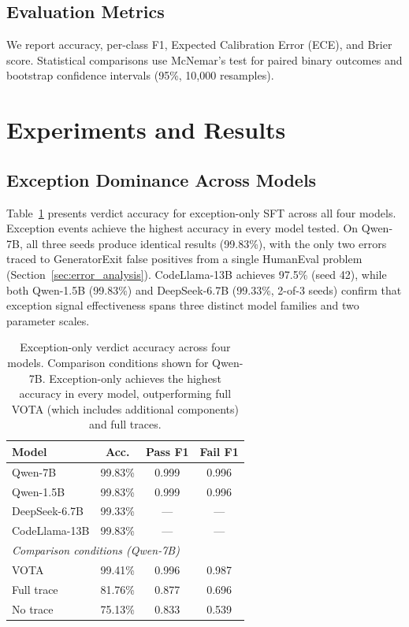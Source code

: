 \documentclass[11pt,a4paper]{article}
\begin{document}
\subsection{Evaluation Metrics}

We report accuracy, per-class F1, Expected Calibration Error (ECE), and Brier score. Statistical comparisons use McNemar's test for paired binary outcomes and bootstrap confidence intervals (95\%, 10,000 resamples).

\section{Experiments and Results}

\subsection{Exception Dominance Across Models}
\label{sec:exception_dominance}

Table~\ref{tab:exception_dominance} presents verdict accuracy for exception-only SFT across all four models. Exception events achieve the highest accuracy in every model tested. On Qwen-7B, all three seeds produce identical results (99.83\%), with the only two errors traced to GeneratorExit false positives from a single HumanEval problem (Section~\ref{sec:error_analysis}). CodeLlama-13B achieves 97.5\% (seed 42), while both Qwen-1.5B (99.83\%) and DeepSeek-6.7B (99.33\%, 2-of-3 seeds) confirm that exception signal effectiveness spans three distinct model families and two parameter scales.

\begin{table}[t]
\centering
\small
\begin{tabular}{lccc}
\toprule
\textbf{Model} & \textbf{Acc.} & \textbf{Pass F1} & \textbf{Fail F1} \\
\midrule
Qwen-7B & 99.83\% & 0.999 & 0.996 \\
Qwen-1.5B & 99.83\% & 0.999 & 0.996 \\
DeepSeek-6.7B & 99.33\% & --- & --- \\
CodeLlama-13B & 99.83\% & --- & --- \\
\midrule
\multicolumn{4}{l}{\emph{Comparison conditions (Qwen-7B)}} \\
VOTA & 99.41\% & 0.996 & 0.987 \\
Full trace & 81.76\% & 0.877 & 0.696 \\
No trace & 75.13\% & 0.833 & 0.539 \\
\bottomrule
\end{tabular}
\caption{Exception-only verdict accuracy across four models. Comparison conditions shown for Qwen-7B. Exception-only achieves the highest accuracy in every model, outperforming full VOTA (which includes additional components) and full traces.}
\label{tab:exception_dominance}
\end{table}
\end{document}
